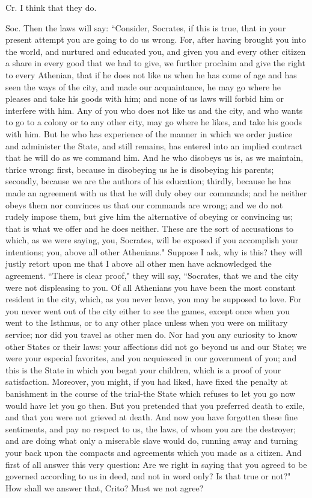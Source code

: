 Cr. I think that they do. 

Soc. Then the laws will say: ``Consider, Socrates, if this is true,
that in your present attempt you are going to do us wrong. For, after
having brought you into the world, and nurtured and educated you,
and given you and every other citizen a share in every good that we
had to give, we further proclaim and give the right to every Athenian,
that if he does not like us when he has come of age and has seen the
ways of the city, and made our acquaintance, he may go where he pleases
and take his goods with him; and none of us laws will forbid him or
interfere with him. Any of you who does not like us and the city,
and who wants to go to a colony or to any other city, may go where
he likes, and take his goods with him. But he who has experience of
the manner in which we order justice and administer the State, and
still remains, has entered into an implied contract that he will do
as we command him. And he who disobeys us is, as we maintain, thrice
wrong: first, because in disobeying us he is disobeying his parents;
secondly, because we are the authors of his education; thirdly, because
he has made an agreement with us that he will duly obey our commands;
and he neither obeys them nor convinces us that our commands are wrong;
and we do not rudely impose them, but give him the alternative of
obeying or convincing us; that is what we offer and he does neither.
These are the sort of accusations to which, as we were saying, you,
Socrates, will be exposed if you accomplish your intentions; you,
above all other Athenians." Suppose I ask, why is this? they will
justly retort upon me that I above all other men have acknowledged
the agreement. ``There is clear proof," they will say, ``Socrates, that
we and the city were not displeasing to you. Of all Athenians you
have been the most constant resident in the city, which, as you never
leave, you may be supposed to love. For you never went out of the
city either to see the games, except once when you went to the Isthmus,
or to any other place unless when you were on military service; nor
did you travel as other men do. Nor had you any curiosity to know
other States or their laws: your affections did not go beyond us and
our State; we were your especial favorites, and you acquiesced in
our government of you; and this is the State in which you begat your
children, which is a proof of your satisfaction. Moreover, you might,
if you had liked, have fixed the penalty at banishment in the course
of the trial-the State which refuses to let you go now would have
let you go then. But you pretended that you preferred death to exile,
and that you were not grieved at death. And now you have forgotten
these fine sentiments, and pay no respect to us, the laws, of whom
you are the destroyer; and are doing what only a miserable slave would
do, running away and turning your back upon the compacts and agreements
which you made as a citizen. And first of all answer this very question:
Are we right in saying that you agreed to be governed according to
us in deed, and not in word only? Is that true or not?" How shall
we answer that, Crito? Must we not agree? 


